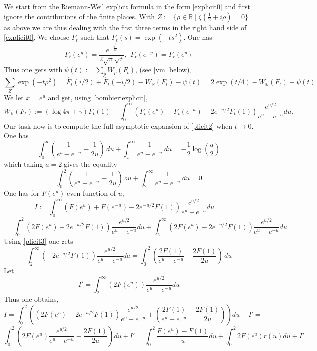 \documentclass[reqno,12pt]{amsart}
\def\R{{\mathbb R}}
\begin{document}
 We start from the Riemann-Weil explicit formula in the form \eqref{explicit0}
and first ignore the contributions of the finite places. With $Z:=\{\rho\in \R\mid \zeta(\frac 12+i\rho)=0\}$ as above we are thus dealing with the first three terms in the  right hand side of \eqref{explicit0}.\newline
 We choose $F_t$ such that ${\widehat F_t}(s)=\exp(-ts^2)$. One has 
 \begin{equation}\label{ft}F_t(e^y)=\frac{e^{-\frac{y^2}{4 t}}}{2\sqrt{ \pi } \sqrt{t}}, \ \ F_t(e^{-y})=F_t(e^y)
 \end{equation} Thus one gets with $ \psi(t):=\sum_p W_p(F_t)$, (see \eqref{vm} below), 
\begin{equation}\label{plicit1}
 \sum_Z \exp(-t\rho^2)= {\widehat F_t}(i/2)+{\widehat F_t}(-i/2)- W_\R(F_t)-\psi(t)=2\exp(t/4)- W_\R(F_t)-\psi(t)
 \end{equation}
  We let $x=e^u$ and get, using \eqref{bombieriexplicit},
\begin{equation}\label{plicit2}
 W_\R(F_t):=(\log 4\pi +\gamma)F_t(1)+\int_{0}^\infty\left(F_t(e^u)+F_t(e^{-u})-2e^{-u/2} F_t(1)\right)\frac{e^{u/2}}{e^u-e^{-u}}du.
 \end{equation}
 Our task now is to compute the full asymptotic expansion of \eqref{plicit2} when $t\to 0$.  One has 
 $$
  \int_0^a \left(\frac{1}{e^u-e^{-u}}-\frac{1}{2 u}\right) \, du+\int_a^{\infty } \frac{1}{e^u-e^{-u}} \, du=-\frac{1}{2} \log \left(\frac{a}{2}\right)
  $$
which taking $a=2$ gives the equality 
\begin{equation}\label{plicit3}
  \int_0^2 \left(\frac{1}{e^u-e^{-u}}-\frac{1}{2 u}\right) \, du+\int_2^{\infty } \frac{1}{e^u-e^{-u}} \, du =0
  \end{equation}
One has for $F(e^u)$ even function of $u$,
$$
I:=\int_{0}^\infty\left(F(e^u)+F(e^{-u})-2e^{-u/2} F(1)\right)\frac{e^{u/2}}{e^u-e^{-u}}du=
$$
$$
=\int_{0}^2\left(2F(e^u)-2e^{-u/2} F(1)\right)\frac{e^{u/2}}{e^u-e^{-u}}du+\int_{2}^\infty\left(2F(e^u)-2e^{-u/2} F(1)\right)\frac{e^{u/2}}{e^u-e^{-u}}du
$$
Using \eqref{plicit3} one gets
$$
\int_{2}^\infty\left(-2e^{-u/2} F(1)\right)\frac{e^{u/2}}{e^u-e^{-u}}du=\int_0^2 \left(\frac{2F(1)}{e^u-e^{-u}}-\frac{2F(1)}{2 u}\right) \, du
$$
Let 
$$I'=\int_{2}^\infty\left(2F(e^u)\right)\frac{e^{u/2}}{e^u-e^{-u}}du$$
Thus one obtains, 
$$
I=\int_{0}^2\left(\left(2F(e^u)-2e^{-u/2} F(1)\right)\frac{e^{u/2}}{e^u-e^{-u}}+\left(\frac{2F(1)}{e^u-e^{-u}}-\frac{2F(1)}{2 u}\right)\right)du+I'=
$$
$$
\int_0^2\left(2F(e^u)\frac{e^{u/2}}{e^u-e^{-u}}-\frac{2F(1)}{2 u}\right)du+I'=\int_0^2 \frac{F(e^u)-F(1)}{u}du+\int_{0}^2 2F(e^u)r(u)du+I'
$$
\end{document}
